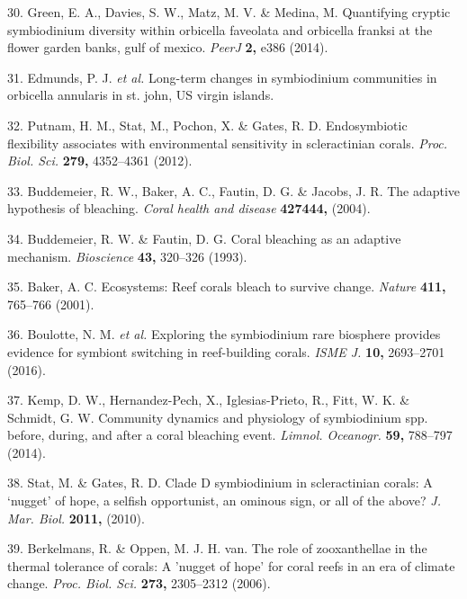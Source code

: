 \documentclass[]{article}
\begin{document}
\hypertarget{ref-Green2014-az}{}
30. Green, E. A., Davies, S. W., Matz, M. V. \& Medina, M. Quantifying
cryptic symbiodinium diversity within orbicella faveolata and orbicella
franksi at the flower garden banks, gulf of mexico. \emph{PeerJ}
\textbf{2,} e386 (2014).

\hypertarget{ref-Edmunds_undated-fd}{}
31. Edmunds, P. J. \emph{et al.} Long-term changes in symbiodinium
communities in orbicella annularis in st. john, US virgin islands.

\hypertarget{ref-Putnam2012-om}{}
32. Putnam, H. M., Stat, M., Pochon, X. \& Gates, R. D. Endosymbiotic
flexibility associates with environmental sensitivity in scleractinian
corals. \emph{Proc. Biol. Sci.} \textbf{279,} 4352--4361 (2012).

\hypertarget{ref-Buddemeier2004-se}{}
33. Buddemeier, R. W., Baker, A. C., Fautin, D. G. \& Jacobs, J. R. The
adaptive hypothesis of bleaching. \emph{Coral health and disease}
\textbf{427444,} (2004).

\hypertarget{ref-Buddemeier1993-sx}{}
34. Buddemeier, R. W. \& Fautin, D. G. Coral bleaching as an adaptive
mechanism. \emph{Bioscience} \textbf{43,} 320--326 (1993).

\hypertarget{ref-Baker2001-vc}{}
35. Baker, A. C. Ecosystems: Reef corals bleach to survive change.
\emph{Nature} \textbf{411,} 765--766 (2001).

\hypertarget{ref-Boulotte2016-dy}{}
36. Boulotte, N. M. \emph{et al.} Exploring the symbiodinium rare
biosphere provides evidence for symbiont switching in reef-building
corals. \emph{ISME J.} \textbf{10,} 2693--2701 (2016).

\hypertarget{ref-Kemp2014-xj}{}
37. Kemp, D. W., Hernandez-Pech, X., Iglesias-Prieto, R., Fitt, W. K. \&
Schmidt, G. W. Community dynamics and physiology of symbiodinium spp.
before, during, and after a coral bleaching event. \emph{Limnol.
Oceanogr.} \textbf{59,} 788--797 (2014).

\hypertarget{ref-Stat2010-zg}{}
38. Stat, M. \& Gates, R. D. Clade D symbiodinium in scleractinian
corals: A `nugget' of hope, a selfish opportunist, an ominous sign, or
all of the above? \emph{J. Mar. Biol.} \textbf{2011,} (2010).

\hypertarget{ref-Berkelmans2006-rf}{}
39. Berkelmans, R. \& Oppen, M. J. H. van. The role of zooxanthellae in
the thermal tolerance of corals: A 'nugget of hope' for coral reefs in
an era of climate change. \emph{Proc. Biol. Sci.} \textbf{273,}
2305--2312 (2006).
\end{document}
